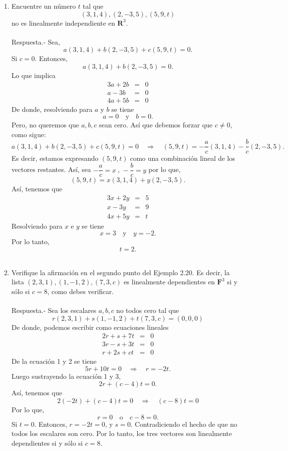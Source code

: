 \begin{enumerate}[\bfseries 1.]
\begin{enumerate}[(a)]
	\end{enumerate}


    \item Encuentre un número $t$ tal que
    $$(3,1,4),(2,-3,5),(5,9,t)$$
    no es linealmente independiente en $\textbf{R}^3$.\\\\
	Respuesta.-\; Sea,
	$$a(3,1,4)+b(2,-3,5)+c(5,9,t)=0.$$
	Si $c=0$. Entonces,
	$$a(3,1,4)+b(2,-3,5)=0.$$
	Lo que implica
	$$
	\begin{array}{rcl}
	    3a+2b&=&0\\
	    a-3b&=&0\\
	    4a+5b&=&0
	\end{array}
	$$
	De donde, resolviendo para $a$ y $b$ se tiene
	$$a=0\quad \mbox{y}\quad b=0.$$
	Pero, no queremos que $a,b,c$ sean cero. Así que debemos forzar que $c\neq 0$, como sigue:
	$$a(3,1,4)+b(2,-3,5)+c(5,9,t)=0\quad \Rightarrow \quad (5,9,t)=-\dfrac{a}{c}(3,1,4)-\dfrac{b}{c}(2,-3,5).$$
	Es decir, estamos expresando $(5,9,t)$ como una combinación lineal de los vectores restantes. Así, sea $-\dfrac{a}{c}=x\;$,$\;-\dfrac{b}{c}=y$  por lo que,
	$$(5,9,t)=x(3,1,4)+y(2,-3,5).$$
	Así, tenemos que
	$$
	\begin{array}{rcl}
	    3x+2y&=&5\\
	    x-3y&=&9\\
	    4x+5y&=&t
	\end{array}
	$$
	Resolviendo para $x$ e $y$ se tiene
	$$x=3\quad \mbox{y}\quad y=-2.$$
	Por lo tanto,
	$$t=2.$$\\

    \item Verifique la afirmación en el segundo punto del Ejemplo 2.20. Es decir, la lista $(2,3,1),(1,-1,2),(7,3,c)$ es linealmente dependientes en $\textbf{F}^3$ si y sólo si $c=8$, como debes verificar.\\\\
	Respuesta.-\; Sea los escalares $a,b,c$  no todos cero tal que
	$$r(2,3,1)+s(1,-1,2)+t(7,3,c)=(0,0,0)$$
	De donde, podemos escribir como ecuaciones lineales
	$$
	\begin{array}{rcl}
	    2r+s+7t&=&0\\
	    3r-s+3t&=&0\\
	    r+2s+ct&=&0
	\end{array}
	$$
	De la ecuación 1 y 2 se tiene
	$$5r+10t=0\quad \Rightarrow \quad r=-2t.$$
	Luego sustrayendo la ecuación 1 y 3, 
	$$2r+(c-4)t=0.$$
	Así, tenemos que
	$$2(-2t)+(c-4)t=0\quad \Rightarrow \quad (c-8)t=0$$
	Por lo que,
	$$r=0\quad \mbox{o}\quad c-8=0.$$
	Si $t=0$. Entonces, $r=-2t = 0$, y $s=0.$ Contradiciendo el hecho de que no todos los escalares son cero. Por lo tanto, los tres vectores son linealmente dependientes si y sólo si $c=8$.\\\\


\end{enumerate}
